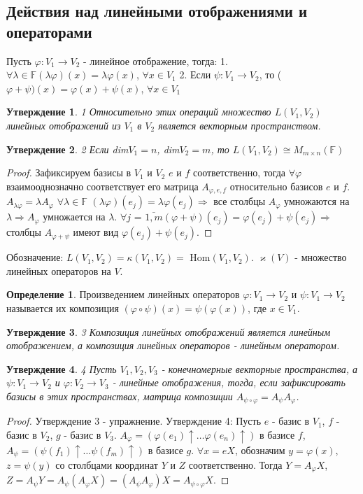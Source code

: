 \documentclass[a4paper, 12pt]{article}
\newcommand{\F}{\mathbb F}
\renewcommand{\phi}{\varphi}
\theoremstyle{definition}
\newtheorem*{definition}{Определение}
\theoremstyle{plain}
\newtheorem*{subtheorem}{Утверждение}
\theoremstyle{remark}
\begin{document}
  \subsection{Действия над линейными отображениями и операторами}
  Пусть $\phi: V_1 \to V_2$ - линейное отображение, тогда:
  1. $\forall \lambda \in \F (\lambda\phi)(x) = \lambda\phi(x)$, $\forall x \in V_1$
  2. Если $\psi: V_1 \to V_2$, то ($\phi+\psi)(x) = \phi(x)+\psi(x)$, $\forall x \in V_1$
  \begin{subtheorem} 1
    Относительно этих операций множество $L(V_1, V_2)$ линейных отображений из $V_1$ в $V_2$ является векторным пространством.
  \end{subtheorem}
  \begin{subtheorem} 2
    Если dim$V_1 = n$, dim$V_2 = m$, то $L(V_1, V_2) \cong M_{m \times n}(\F)$
  \end{subtheorem}
  \begin{proof}
    Зафиксируем базисы в $V_1$ и $V_2$ $e$ и $f$ соответственно, тогда $\forall \phi$ взаимооднозначно соответствует его матрица $A_{\phi, e, f}$ относительно базисов $e$ и $f$.
    $A_{\lambda \phi} = \lambda A_{\phi}$  $\forall \lambda \in \F$
    $(\lambda \phi)(e_j) = \lambda \phi(e_j) \Longrightarrow$ все столбцы $A_{\phi}$ умножаются на $\lambda \Longrightarrow A_{\phi}$ умножается на $\lambda$.
    $\forall j$ = $\bar{1, m} (\phi + \psi)(e_j) = \phi(e_j) + \psi(e_j) \Longrightarrow$ столбцы $A_{\phi + \psi}$ имеют вид $\phi(e_j) + \psi(e_j)$.
  \end{proof}
  Обозначение: $L(V_1, V_2) = \kappa(V_1, V_2) =$ Hom$(V_1, V_2)$.
  $\varkappa(V)$ - множество линейных операторов на $V$.
  \begin{definition}
    Произведением линейных операторов $\phi: V_1 \to V_2$ и $\psi: V_1 \to V_2$ называется их композиция $(\phi\circ\psi)(x) = \psi(\phi(x))$, где $x \in V_1$.
  \end{definition}
  \begin{subtheorem} 3
    Композиция линейных отображений является линейным отображением, а композиция линейных операторов - линейным оператором.
  \end{subtheorem}
  \begin{subtheorem} 4
    Пусть $V_1, V_2, V_3$ - конечномерные векторные пространства, а $\psi: V_1 \to V_2$ и $\phi: V_2 \to V_3$ - линейные отображения, тогда, если зафиксировать базисы в этих пространствах, матрица композиции $A_{\psi\circ\phi} = A_{\psi} A_{\phi}$.
  \end{subtheorem}
  \begin{proof}
    Утверждение 3 - упражнение.
    Утверждение 4:
    Пусть $e$ - базис в $V_1$, $f$ - базис в $V_2$, $g$ - базис в $V_3$.
    $A_{\phi} = (\phi(e_1)\uparrow \ldots \phi(e_n)\uparrow)$ в базисе $f$, $A_{\psi} = (\psi(f_1)\uparrow \dots \psi(f_m)\uparrow)$ в базисе $g$.    $\forall x = e X$, обозначим $y = \phi(x)$, $z = \psi(y)$ со столбцами координат $Y$ и $Z$ соответственно.
    Тогда $Y = A_{\phi}X$, $Z = A_{\psi}Y = A_{\psi}(A_{\phi}X) = (A_{\psi}A_{\phi})X = A_{\psi\circ\phi}X$.
  \end{proof}
\end{document}
